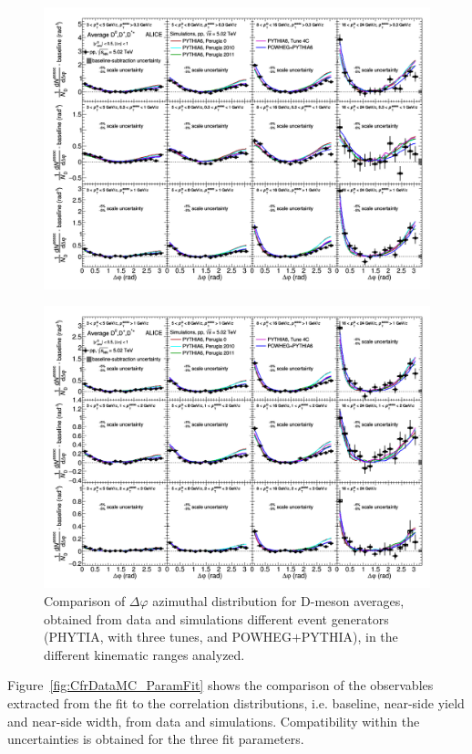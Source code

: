 \begin{figure}[h]
\centering
\includegraphics[width=1.3\textwidth, angle=90]{figures/CfrPPandModels/CorrelationppMC4x6_1New.png}
\end{figure}
\begin{figure}[h]
\centering
\includegraphics[width=1.3\textwidth, angle=90]{figures/CfrPPandModels/CorrelationppMC4x6_2New.png}
\caption{Comparison of $\Delta\varphi$ azimuthal distribution for D-meson averages, obtained from data and simulations different event generators (PHYTIA, with three tunes, and POWHEG$+$PYTHIA), in the different kinematic ranges analyzed.}
\label{pp-models}
\end{figure}

Figure~\ref{fig:CfrDataMC_ParamFit} shows the comparison of the observables extracted from the fit to the correlation distributions, i.e. baseline, near-side yield and near-side width, from data and simulations. Compatibility within the uncertainties is obtained for the three fit parameters.%

